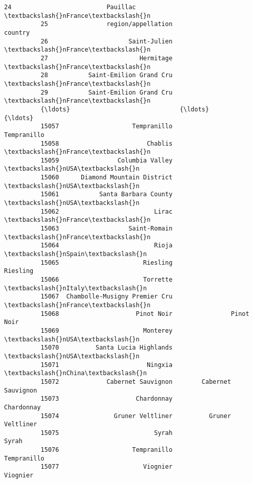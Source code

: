 \documentclass[11pt]{article}
\begin{document}
\begin{Verbatim}[commandchars=\\\{\}]
          24                          Pauillac                \textbackslash{}nFrance\textbackslash{}n   
          25                region/appellation                   country   
          26                      Saint-Julien                \textbackslash{}nFrance\textbackslash{}n   
          27                         Hermitage                \textbackslash{}nFrance\textbackslash{}n   
          28           Saint-Emilion Grand Cru                \textbackslash{}nFrance\textbackslash{}n   
          29           Saint-Emilion Grand Cru                \textbackslash{}nFrance\textbackslash{}n   
          {\ldots}                              {\ldots}                       {\ldots}   
          15057                    Tempranillo               Tempranillo   
          15058                        Chablis                \textbackslash{}nFrance\textbackslash{}n   
          15059                Columbia Valley                   \textbackslash{}nUSA\textbackslash{}n   
          15060      Diamond Mountain District                   \textbackslash{}nUSA\textbackslash{}n   
          15061           Santa Barbara County                   \textbackslash{}nUSA\textbackslash{}n   
          15062                          Lirac                \textbackslash{}nFrance\textbackslash{}n   
          15063                   Saint-Romain                \textbackslash{}nFrance\textbackslash{}n   
          15064                          Rioja                 \textbackslash{}nSpain\textbackslash{}n   
          15065                       Riesling                  Riesling   
          15066                       Torrette                 \textbackslash{}nItaly\textbackslash{}n   
          15067  Chambolle-Musigny Premier Cru                \textbackslash{}nFrance\textbackslash{}n   
          15068                     Pinot Noir                Pinot Noir   
          15069                       Monterey                   \textbackslash{}nUSA\textbackslash{}n   
          15070          Santa Lucia Highlands                   \textbackslash{}nUSA\textbackslash{}n   
          15071                        Ningxia                 \textbackslash{}nChina\textbackslash{}n   
          15072             Cabernet Sauvignon        Cabernet Sauvignon   
          15073                     Chardonnay                Chardonnay   
          15074               Gruner Veltliner          Gruner Veltliner   
          15075                          Syrah                     Syrah   
          15076                    Tempranillo               Tempranillo   
          15077                       Viognier                  Viognier   

\end{Verbatim}
\end{document}
